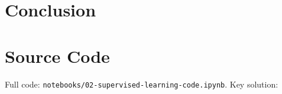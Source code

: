 \documentclass[11pt,a4paper]{article}
\begin{document}
\section{Conclusion}



\appendix
\section{Source Code}
Full code: \texttt{notebooks/02-supervised-learning-code.ipynb}. Key solution:
\end{document}
